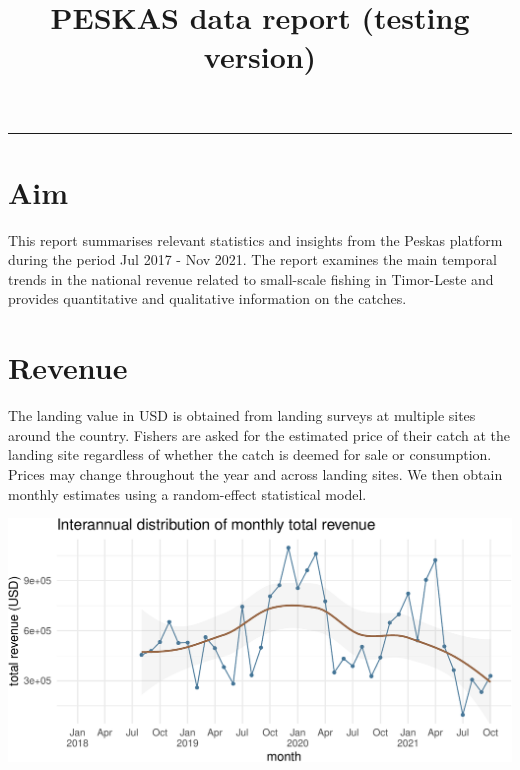 \documentclass[
]{article}
\title{PESKAS data report (testing version)}
\author{}
\date{\vspace{-2.5em}}
\begin{document}
\maketitle

{
\setcounter{tocdepth}{2}
\tableofcontents
}
\begin{center}\rule{0.5\linewidth}{0.5pt}\end{center}

\hypertarget{aim}{%
\section{Aim}\label{aim}}

This report summarises relevant statistics and insights from the Peskas platform during the period Jul 2017 - Nov 2021. The report examines the main temporal trends in the national revenue related to small-scale fishing in Timor-Leste and provides quantitative and qualitative information on the catches.

\hypertarget{revenue}{%
\section{Revenue}\label{revenue}}

The landing value in USD is obtained from landing surveys at multiple sites around the country. Fishers are asked for the estimated price of their catch at the landing site regardless of whether the catch is deemed for sale or consumption. Prices may change throughout the year and across landing sites. We then obtain monthly estimates using a random-effect statistical model.
\newline

\includegraphics{data_report_files/figure-latex/unnamed-chunk-2-1.pdf}
\newline
\newline
\end{document}
